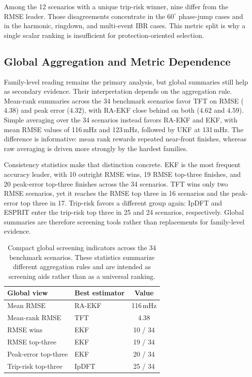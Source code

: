 Among the 12 scenarios with a unique trip-risk winner, nine differ from the
RMSE leader. Those disagreements concentrate in the $60^\circ$ phase-jump
cases and in the harmonic, ringdown, and multi-event IBR cases. This metric
split is why a single scalar ranking is insufficient for
protection-oriented selection.

\subsection{Global Aggregation and Metric Dependence}

Family-level reading remains the primary analysis, but global summaries still
help as secondary evidence. Their interpretation depends on the aggregation
rule. Mean-rank summaries across the 34 benchmark scenarios favor TFT on RMSE
($4.38$) and peak error ($4.32$), with RA-EKF close behind on both ($4.62$
and $4.59$). Simple averaging over the 34 scenarios instead favors RA-EKF and
EKF, with mean RMSE values of 116\,mHz and 123\,mHz, followed by UKF at
131\,mHz. The difference is informative: mean rank rewards repeated near-front
finishes, whereas raw averaging is driven more strongly by the hardest
families.

Consistency statistics make that distinction concrete. EKF is the most frequent
accuracy leader, with 10 outright RMSE wins, 19 RMSE top-three finishes, and
20 peak-error top-three finishes across the 34 scenarios. TFT wins only two
RMSE scenarios, yet it reaches the RMSE top three in 16 scenarios and the
peak-error top three in 17. Trip-risk favors a different group again: IpDFT
and ESPRIT enter the trip-risk top three in 25 and 24 scenarios, respectively.
Global summaries are therefore screening tools rather than replacements for
family-level evidence.

\begin{table}[t]
  \centering
  \caption{Compact global screening indicators across the 34 benchmark
    scenarios. These statistics summarize different aggregation rules and are
    intended as screening aids rather than as a universal ranking.}
  \label{tab:global_screening}
  \scriptsize
  \setlength{\tabcolsep}{3pt}
  \renewcommand{\arraystretch}{1.08}
  \begin{tabular}{L{1.85cm} L{2.1cm} c}
    \toprule
    Global view & Best estimator & Value \\
    \midrule
    Mean RMSE & RA-EKF & 116\,mHz \\
    Mean-rank RMSE & TFT & 4.38 \\
    RMSE wins & EKF & 10 / 34 \\
    RMSE top-three & EKF & 19 / 34 \\
    Peak-error top-three & EKF & 20 / 34 \\
    Trip-risk top-three & IpDFT & 25 / 34 \\
    \bottomrule
  \end{tabular}
\end{table}

